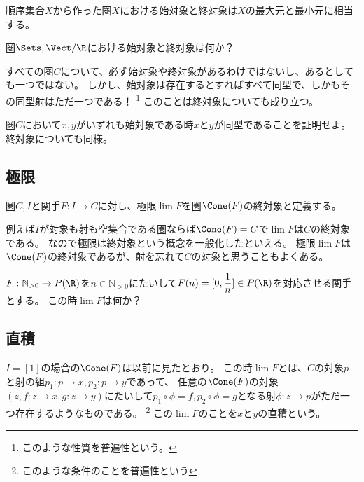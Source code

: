 \documentclass[uplatex]{jsarticle}
\begin{document}
順序集合$X$から作った圏$X$における始対象と終対象は$X$の最大元と最小元に相当する。

\begin{prob}
圏$\Sets, \Vect/\R$における始対象と終対象は何か？
\end{prob}

すべての圏$C$について、必ず始対象や終対象があるわけではないし、あるとしても一つではない。
しかし、始対象は存在するとすればすべて同型で、しかもその同型射はただ一つである！
\footnote{このような性質を普遍性という。}
このことは終対象についても成り立つ。

\begin{prob}
圏$C$において$x,y$がいずれも始対象である時$x$と$y$が同型であることを証明せよ。
終対象についても同様。
\end{prob}

\subsection{極限}
\begin{dfn}
圏$C, I$と関手$F:I\to C$に対し、極限$\lim F$を圏$\Cone(F)$の終対象と定義する。
\end{dfn}

例えば$I$が対象も射も空集合である圏ならば$\Cone(F)=C$で$\lim F$は$C$の終対象である。
なので極限は終対象という概念を一般化したといえる。
極限$\lim F$は$\Cone(F)$の終対象であるが、射を忘れて$C$の対象と思うこともよくある。

\begin{prob}
$F:\mathbb{N}_{>0}\to P(\R)$を$n\in \mathbb{N}_{>0}$にたいして$F(n)=[0,\dfrac{1}{n}]\in P(\R)$を対応させる関手とする。
この時$\lim F$は何か？
\end{prob}
\subsection{直積}
$I=[1]$の場合の$\Cone(F)$は以前に見たとおり。
この時$\lim F$とは、$C$の対象$p$と射の組$p_1:p\to x, p_2:p\to y$であって、
任意の$\Cone(F)$の対象$(z, f:z\to x, g:z\to y)$にたいして$p_1\circ\phi=f, p_2\circ\phi=g$となる射$\phi:z\to p$がただ一つ存在するようなものである。
\footnote{このような条件のことを普遍性という}
この$\lim F$のことを$x$と$y$の直積という。
\end{document}
